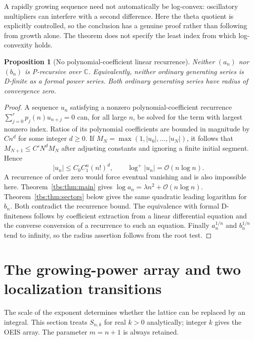 \documentclass[11pt,a4paper]{article}
\numberwithin{equation}{section}
\newtheorem{proposition}[theorem]{Proposition}
\theoremstyle{definition}
\newcommand{\OO}{\mathcal O}
\begin{document}
A rapidly growing sequence need not automatically be log-convex:
oscillatory multipliers can interfere with a second difference. Here the
theta quotient is explicitly controlled, so the conclusion has a genuine
proof rather than following from growth alone. The theorem does not
specify the least index from which log-convexity holds.

\begin{proposition}[No polynomial-coefficient linear recurrence]\label{tbs:prop:nonprecursive}
Neither $(a_n)$ nor $(b_n)$ is P-recursive over $\mathbb C$. Equivalently,
neither ordinary generating series is D-finite as a formal power series.
Both ordinary generating series have radius of convergence zero.
\end{proposition}
\begin{proof}
A sequence $u_n$ satisfying a nonzero polynomial-coefficient recurrence
$\sum_{j=0}^r p_j(n)u_{n+j}=0$ can, for all large $n$, be solved for the
term with largest nonzero index. Ratios of its polynomial coefficients
are bounded in magnitude by $Cn^d$ for some integer $d\ge0$.
If $M_N=\max(1,|u_0|,\ldots,|u_N|)$, it follows that
$M_{N+1}\le C' N^dM_N$ after adjusting constants and ignoring a finite
initial segment. Hence
\[
 |u_n|\le C_0C_1^n(n!)^d,\qquad \log^+|u_n|=\OO(n\log n).
\]
A recurrence of order zero would force eventual vanishing and is also
impossible here. Theorem~\ref{tbs:thm:main} gives
$\log a_n=\lambda n^2+\OO(n\log n)$. Theorem~\ref{tbs:thm:sectors}
below gives the same quadratic leading logarithm for $b_n$.
Both contradict the recurrence bound. The equivalence with formal
D-finiteness follows by coefficient extraction from a linear differential
equation and the converse conversion of a recurrence to such an equation.
Finally $a_n^{1/n}$ and $b_n^{1/n}$ tend to infinity, so the radius
assertion follows from the root test.
\end{proof}

\section{The growing-power array and two localization transitions}\label{tbs:sec:array}

The scale of the exponent determines whether the lattice can be replaced
by an integral. This section treats $S_{n,k}$ for real $k>0$ analytically;
integer $k$ gives the OEIS array. The parameter $m=n+1$ is always retained.
\end{document}
